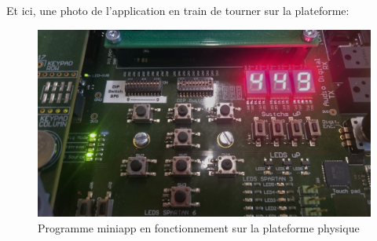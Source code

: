 Et ici, une photo de l'application en train de tourner sur la plateforme:
\begin{figure}[H]
    \begin{center}
        \includegraphics[width=15cm]{img/miniapp_reptar.JPG}
        \caption{Programme miniapp en fonctionnement sur la plateforme physique}
        \label{miniapp_reptar}
    \end{center}
\end{figure}
